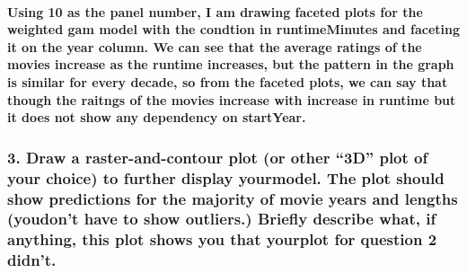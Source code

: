 \documentclass[
]{article}
\begin{document}
\hypertarget{using-10-as-the-panel-number-i-am-drawing-faceted-plots-for-the-weighted-gam-model-with-the-condtion-in-runtimeminutes-and-faceting-it-on-the-year-column.-we-can-see-that-the-average-ratings-of-the-movies-increase-as-the-runtime-increases-but-the-pattern-in-the-graph-is-similar-for-every-decade-so-from-the-faceted-plots-we-can-say-that-though-the-raitngs-of-the-movies-increase-with-increase-in-runtime-but-it-does-not-show-any-dependency-on-startyear.}{%
\paragraph{Using 10 as the panel number, I am drawing faceted plots for
the weighted gam model with the condtion in runtimeMinutes and faceting
it on the year column. We can see that the average ratings of the movies
increase as the runtime increases, but the pattern in the graph is
similar for every decade, so from the faceted plots, we can say that
though the raitngs of the movies increase with increase in runtime but
it does not show any dependency on
startYear.}\label{using-10-as-the-panel-number-i-am-drawing-faceted-plots-for-the-weighted-gam-model-with-the-condtion-in-runtimeminutes-and-faceting-it-on-the-year-column.-we-can-see-that-the-average-ratings-of-the-movies-increase-as-the-runtime-increases-but-the-pattern-in-the-graph-is-similar-for-every-decade-so-from-the-faceted-plots-we-can-say-that-though-the-raitngs-of-the-movies-increase-with-increase-in-runtime-but-it-does-not-show-any-dependency-on-startyear.}}

\hypertarget{draw-a-raster-and-contour-plot-or-other-3d-plot-of-your-choice-to-further-display-yourmodel.-the-plot-should-show-predictions-for-the-majority-of-movie-years-and-lengths-youdont-have-to-show-outliers.-briefly-describe-what-if-anything-this-plot-shows-you-that-yourplot-for-question-2-didnt.}{%
\subsubsection{3. Draw a raster-and-contour plot (or other ``3D'' plot
of your choice) to further display yourmodel. The plot should show
predictions for the majority of movie years and lengths (youdon't have
to show outliers.) Briefly describe what, if anything, this plot shows
you that yourplot for question 2
didn't.}\label{draw-a-raster-and-contour-plot-or-other-3d-plot-of-your-choice-to-further-display-yourmodel.-the-plot-should-show-predictions-for-the-majority-of-movie-years-and-lengths-youdont-have-to-show-outliers.-briefly-describe-what-if-anything-this-plot-shows-you-that-yourplot-for-question-2-didnt.}}
\end{document}
